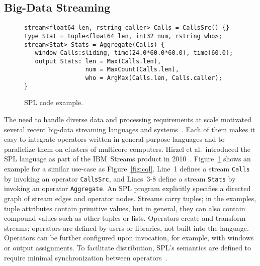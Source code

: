 \subsection{Big-Data Streaming}\label{sec:big} %

\begin{figure}[!h]
\begin{lstlisting}[xleftmargin=2mm,morekeywords={stream,float64,rstring,type,int32,window,output,tuple}]
stream<float64 len, rstring caller> Calls = CallsSrc() {}
type Stat = tuple<float64 len, int32 num, rstring who>;
stream<Stat> Stats = Aggregate(Calls) {
   window Calls:sliding, time(24.0*60.0*60.0), time(60.0);
   output Stats: len = Max(Calls.len),
                 num = MaxCount(Calls.len),
                 who = ArgMax(Calls.len, Calls.caller);
}
\end{lstlisting}
\vspace*{-4mm}
\caption{\label{fig:spl}SPL code example.}
\end{figure}

The need to handle diverse data and processing requirements at scale
motivated several recent big-data streaming languages and
systems~\cite{akidau_et_al_2013,akidau_et_al_2015,carbone_et_al_2015,chandramouli_et_al_2014,hirzel_schneider_gedik_2017,kulkarni_et_al_2015,murray_et_al_2013,toshniwal_et_al_2014,zaharia_et_al_2013}.
Each of them makes it easy to integrate operators written in
general-purpose languages and to parallelize them on clusters of
multicore computers. Hirzel et al.\ introduced the \textsf{SPL}
language as part of the \textsf{IBM~Streams} product in
2010~\cite{hirzel_et_al_2009,hirzel_schneider_gedik_2017}.
Figure~\ref{fig:spl} shows an example for a similar
use-case as Figure~\ref{fig:cql}. Line~1 defines a stream
\lstinline{Calls} by invoking an operator \lstinline{CallsSrc}, and
\mbox{Lines 3-8} define a stream \lstinline{Stats} by invoking an
operator \lstinline{Aggregate}. An SPL program explicitly specifies a
directed graph of stream edges and operator nodes. Streams carry
tuples; in the examples, tuple attributes contain primitive values,
but in general, they can also contain compound values such as other
tuples or lists.  Operators create and transform streams; operators
are defined by users or libraries, not built into the
language. Operators can be further configured upon invocation, for
example, with windows or output assignments. To facilitate
distribution, SPL's semantics are defined to require minimal
synchronization between operators~\cite{soule_et_al_2016}.

